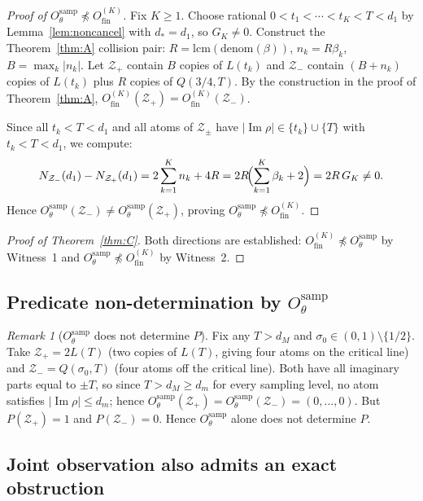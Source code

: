 \documentclass[12pt]{amsart}
\theoremstyle{definition}
\theoremstyle{remark}
\newtheorem{remark}[definition]{Remark}
\theoremstyle{plain}
\newcommand{\Ofinite}{O_{\mathrm{fin}}}
\newcommand{\Otheta}{O_{\theta}^{\mathrm{samp}}}
\newcommand{\im}{\operatorname{Im}}
\begin{document}
\begin{proof}[Proof of $\Otheta \npreceq \Ofinite^{(K)}$]
Fix $K \geq 1$.  Choose rational $0 < t_1 < \cdots < t_K < T < d_1$
by Lemma~\ref{lem:noncancel} with $d_* = d_1$, so $G_K \neq 0$.
Construct the Theorem~\ref{thm:A} collision pair: $R = \mathrm{lcm}(\mathrm{denom}(\beta))$,
$n_k = R\beta_k$, $B = \max_k|n_k|$.  Let $\mathcal{Z}_+$ contain $B$
copies of $L(t_k)$ and $\mathcal{Z}_-$ contain $(B+n_k)$ copies of
$L(t_k)$ plus $R$ copies of $Q(3/4,T)$.
By the construction in the proof of Theorem~\ref{thm:A}, $\Ofinite^{(K)}(\mathcal{Z}_+) = \Ofinite^{(K)}(\mathcal{Z}_-)$.

Since all $t_k < T < d_1$ and all atoms of $\mathcal{Z}_\pm$ have
$|\im\rho| \in \{t_k\} \cup \{T\}$ with $t_k < T < d_1$, we compute:
\[
  N_{\mathcal{Z}_-}(d_1) - N_{\mathcal{Z}_+}(d_1)
  = 2\sum_{k=1}^K n_k + 4R
  = 2R\!\Bigl(\sum_{k=1}^K \beta_k + 2\Bigr)
  = 2R \, G_K \neq 0.
\]
Hence $\Otheta(\mathcal{Z}_-) \neq \Otheta(\mathcal{Z}_+)$,
proving $\Otheta \npreceq \Ofinite^{(K)}$.
\end{proof}

\begin{proof}[Proof of Theorem~\ref{thm:C}]
Both directions are established:
$\Ofinite^{(K)} \npreceq \Otheta$ by Witness~1
and $\Otheta \npreceq \Ofinite^{(K)}$ by Witness~2.
\end{proof}

\subsection{Predicate non-determination by \texorpdfstring{$\Otheta$}{O-theta}}

\begin{remark}[$\Otheta$ does not determine $P$]
\label{rem:theta-not-P}
Fix any $T > d_M$ and $\sigma_0 \in (0,1)\setminus\{1/2\}$.  Take
$\mathcal{Z}_+ = 2L(T)$ (two copies of $L(T)$, giving four atoms on
the critical line) and $\mathcal{Z}_- = Q(\sigma_0, T)$ (four atoms off
the critical line).  Both have all imaginary parts equal to $\pm T$, so
since $T > d_M \geq d_m$ for every sampling level, no atom satisfies
$|\im\rho| \leq d_m$; hence
$\Otheta(\mathcal{Z}_+) = \Otheta(\mathcal{Z}_-) = (0,\ldots,0)$.
But $P(\mathcal{Z}_+)=1$ and $P(\mathcal{Z}_-)=0$.
Hence $\Otheta$ alone does not determine $P$.
\end{remark}

\subsection{Joint observation also admits an exact obstruction}
\end{document}

